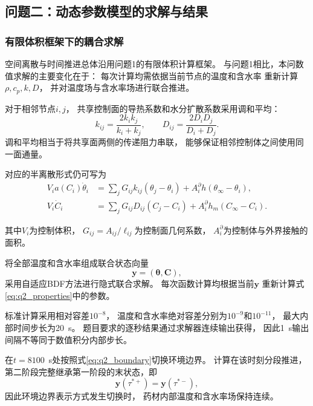 \documentclass[withoutpreface]{cumcmthesis}
\begin{document}

\subsection{问题二：动态参数模型的求解与结果}

\subsubsection{有限体积框架下的耦合求解}

空间离散与时间推进总体沿用问题1的有限体积计算框架。
与问题1相比，本问数值求解的主要变化在于：
每次计算均需依据当前节点的温度和含水率
重新计算$\rho,c_p,k,D$，
并对温度场与含水率场进行联合推进。

对于相邻节点$i,j$，
共享控制面的导热系数和水分扩散系数采用调和平均：
\[
k_{ij}
=
\frac{2k_ik_j}{k_i+k_j},
\qquad
D_{ij}
=
\frac{2D_iD_j}{D_i+D_j}.
\]
调和平均相当于将共享面两侧的传递阻力串联，
能够保证相邻控制体之间使用同一面通量。

对应的半离散形式仍可写为
\begin{equation}\label{eq:q2_fvm}
\begin{aligned}
V_i a(C_i)\dot\theta_i
&=
\sum_j
G_{ij}k_{ij}(\theta_j-\theta_i)
+
A_i^{\partial}h(\theta_\infty-\theta_i),
\\
V_i\dot C_i
&=
\sum_j
G_{ij}D_{ij}(C_j-C_i)
+
A_i^{\partial}h_m(C_\infty-C_i).
\end{aligned}
\end{equation}

其中$V_i$为控制体积，
$G_{ij}=A_{ij}/\ell_{ij}$为控制面几何系数，
$A_i^{\partial}$为控制体与外界接触的面积。

将全部温度和含水率组成联合状态向量
\[
\boldsymbol y
=
(\boldsymbol\theta,\boldsymbol C),
\]
采用自适应BDF方法进行隐式联合求解\cite{Virtanen2020}。
每次函数计算均根据当前$\boldsymbol y$
重新计算式\eqref{eq:q2_properties}中的参数。

标准计算采用相对容差$10^{-8}$，
温度和含水率绝对容差分别为$10^{-9}$和$10^{-11}$，
最大内部时间步长为20~s。
题目要求的逐秒结果通过求解器连续输出获得，
因此1~s输出间隔不等同于数值积分内部步长。

在$t=8100$~s处按照式\eqref{eq:q2_boundary}切换环境边界。
计算在该时刻分段推进，
第二阶段完整继承第一阶段的末状态，即
\[
\boldsymbol y(\tau^{*+})
=
\boldsymbol y(\tau^{*-}),
\]
因此环境边界表示方式发生切换时，
药材内部温度和含水率场保持连续。
\end{document}
